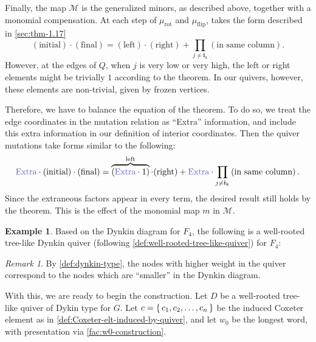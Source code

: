 \documentclass{amsart}
\theoremstyle{plain}
\theoremstyle{definition}
\newtheorem{example}[theorem]{Example}
\theoremstyle{remark}
\newtheorem{remark}[theorem]{Remark}
\newcommand{\conftoquiv}{\mathcal{M}}
\newcommand{\monomialmap}{m}
\newcommand{\word}[1]{\mathbf{#1}}
\newcommand{\muflip}{{\mu_{\text{flip}}}}
\newcommand{\murot}{{\mu_{\text{rot}}}}
\newcommand{\inldynkinFfour}{\raisebox{-0.1ex}{}}
\begin{document}
  Finally, the map $\conftoquiv$ is the generalized minors, as described
  above, together with a monomial compensation. At each step of $\murot$
  and $\muflip$, \cite[Theorem~1.17]{fominzelevinsky1999} takes the form
  described in \cref{sec:thm-1.17} \[ (\text{initial}) \cdot
    (\text{final}) = (\text{left}) \cdot (\text{right}) + \prod_{j \ne
      \word{i}_k} \left( \text{in same column} \right). \] However, at
  the edges of $Q$, when $j$ is very low or very high, the left or right
  elements might be trivially $1$ according to the theorem. In our
  quivers, however, these elements are non-trivial, given by frozen
  vertices.

  Therefore, we have to balance the equation of the theorem. To do so,
  we treat the edge coordinates in the mutation relation as ``Extra''
  information, and include this extra information in our definition of
  interior coordinates. Then the quiver mutations take forms similar to
  the following: \[ {\color{blue!60!darkgray!70} \text{Extra} } \cdot
    (\text{initial}) \cdot (\text{final}) =
    \overbrace{({\color{blue!60!darkgray!70}\text{Extra} } \cdot
      1)}^{\text{left}} \cdot (\text{right}) +
    {\color{blue!60!darkgray!70} \text{Extra} } \cdot \prod_{j \ne
      \word{i}_k} \left( \text{in same column} \right). \] Since the
  extraneous factors appear in every term, the desired result still
  holds by the theorem. This is the effect of the monomial map
  $\monomialmap$ in $\conftoquiv$.

  \begin{example}
    \label{ex:dynkin-quiver-f4}
    Based on the Dynkin diagram \inldynkinFfour{} for $F_4$, the
    following is a well-rooted tree-like Dynkin quiver (following
    \cref{def:well-rooted-tree-like-quiver}) for $F_4$:

    {\centering 

    }
  \end{example}

  \begin{remark}
    \label{rem:sizes-get-switched}
    By \cref{def:dynkin-type}, the nodes with higher weight in the
    quiver correspond to the nodes which are ``smaller'' in the Dynkin
    diagram.
  \end{remark}

  With this, we are ready to begin the construction. Let $D$ be a
  well-rooted tree-like quiver of Dykin type for $G$. Let $c = \set{c_1,
    c_2, \dotsc, c_n}$ be the induced Coxeter element as in
  \cref{def:Coxeter-elt-induced-by-quiver}, and let $w_0$ be the longest
  word, with presentation via \cref{fac:w0-construction}.
\end{document}
